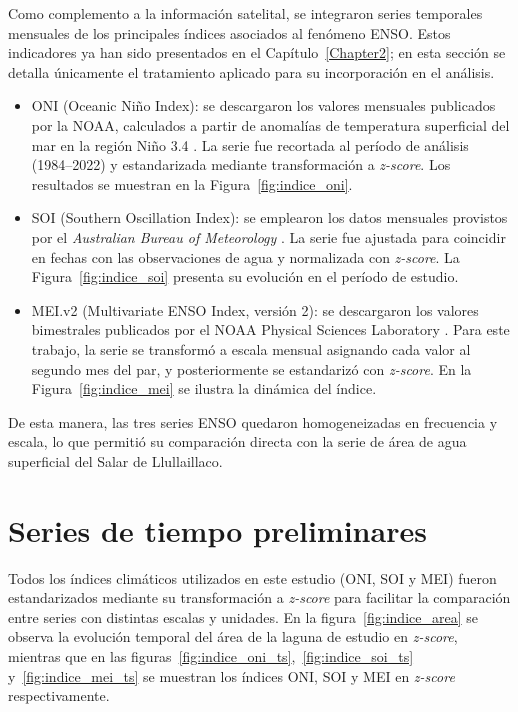 Como complemento a la información satelital, se integraron series temporales mensuales de los principales índices asociados al fenómeno ENSO. Estos indicadores ya han sido presentados en el Capítulo~\ref{Chapter2}; en esta sección se detalla únicamente el tratamiento aplicado para su incorporación en el análisis.

\begin{itemize}
    \item ONI (Oceanic Niño Index): se descargaron los valores mensuales publicados por la NOAA, calculados a partir de anomalías de temperatura superficial del mar en la región Niño 3.4 \parencite{noaaONI}. La serie fue recortada al período de análisis (1984--2022) y estandarizada mediante transformación a \textit{z-score}. Los resultados se muestran en la Figura~\ref{fig:indice_oni}.
    
    \item SOI (Southern Oscillation Index): se emplearon los datos mensuales provistos por el \textit{Australian Bureau of Meteorology} \parencite{bom_soi_2024}. La serie fue ajustada para coincidir en fechas con las observaciones de agua y normalizada con \textit{z-score}. La Figura~\ref{fig:indice_soi} presenta su evolución en el período de estudio.
    
    \item MEI.v2 (Multivariate ENSO Index, versión 2): se descargaron los valores bimestrales publicados por el NOAA Physical Sciences Laboratory \parencite{meiindex}. Para este trabajo, la serie se transformó a escala mensual asignando cada valor al segundo mes del par, y posteriormente se estandarizó con \textit{z-score}. En la Figura~\ref{fig:indice_mei} se ilustra la dinámica del índice.
\end{itemize}

De esta manera, las tres series ENSO quedaron homogeneizadas en frecuencia y escala, lo que permitió su comparación directa con la serie de área de agua superficial del Salar de Llullaillaco.




\section{Series de tiempo preliminares}

Todos los índices climáticos utilizados en este estudio (ONI, SOI y MEI) fueron estandarizados mediante su transformación a \textit{z-score} para facilitar la comparación entre series con distintas escalas y unidades. En la figura~\ref{fig:indice_area} se observa la evolución temporal del área de la laguna de estudio en \textit{z-score}, mientras que en las figuras~\ref{fig:indice_oni_ts},~\ref{fig:indice_soi_ts} y~\ref{fig:indice_mei_ts} se muestran los índices ONI, SOI y MEI en \textit{z-score} respectivamente.

